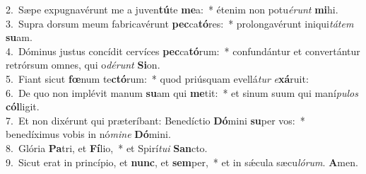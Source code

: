 {2.~}Sæpe expugnavérunt me a juven\textbf{tú}te \textbf{me}a:~* étenim non potu\textit{é}\textit{runt} \textbf{mi}hi.\\
{3.~}Supra dorsum meum fabricavérunt \textbf{pec}ca\textbf{tó}res:~* prolongavérunt iniqui\textit{tá}\textit{tem} \textbf{su}am.\\
{4.~}Dóminus justus concídit cervíces \textbf{pec}ca\textbf{tó}rum:~* confundántur et convertántur retrórsum omnes, qui o\textit{dé}\textit{runt} \textbf{Si}on.\\
{5.~}Fiant sicut \textbf{fœ}num te\textbf{ctó}rum:~* quod priúsquam evellá\textit{tur} \textit{e}\textbf{xá}ruit:\\
{6.~}De quo non implévit manum \textbf{su}am qui \textbf{me}tit:~* et sinum suum qui maní\textit{pu}\textit{los} \textbf{cól}ligit.\\
{7.~}Et non dixérunt qui præteríbant: Benedíctio \textbf{Dó}mini \textbf{su}per vos:~* benedíximus vobis in nó\textit{mi}\textit{ne} \textbf{Dó}mini.\\
{8.~}Glória \textbf{Pa}tri, et \textbf{Fí}lio,~* et Spirí\textit{tu}\textit{i} \textbf{San}cto.\\
{9.~}Sicut erat in princípio, et \textbf{nunc}, et \textbf{sem}per,~* et in sǽcula sæcu\textit{ló}\textit{rum}. \textbf{A}men.\\

